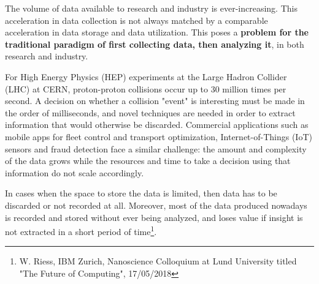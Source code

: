 \vspace{-2mm}

The volume of data available to research and industry is ever-increasing. 
This acceleration in data collection is not always matched by a comparable acceleration in data storage and data utilization. 
This poses a \textbf{problem for the traditional paradigm of first collecting data, then analyzing it}, in both research and industry. 

For High Energy Physics (HEP) experiments at the Large Hadron Collider (LHC) at CERN, proton-proton collisions occur up to 30 million times per second. A decision on whether a collision "event" is interesting must be made in the order of milliseconds, and novel techniques are needed in order to extract information that would otherwise be discarded. Commercial applications such as mobile apps for fleet control and transport optimization, Internet-of-Things (IoT) sensors and fraud detection face a similar challenge: the amount and complexity of the data grows while the resources and time to take a decision using that information do not scale accordingly.

In cases when the space to store the data is limited, then data has to be discarded or not recorded at all. 
Moreover, most of the data produced nowadays is recorded and stored without ever being analyzed, and loses value if insight is not extracted in a short period of time\footnote{W. Riess, IBM Zurich, Nanoscience Colloquium at Lund University titled "The Future of Computing", 17/05/2018}. 

